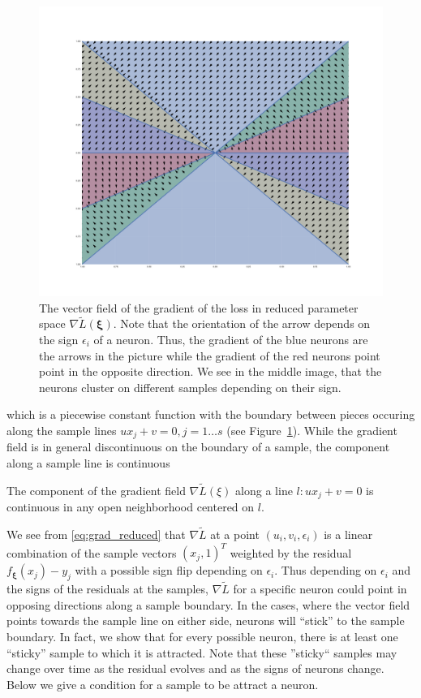 \begin{figure}
    \endminipage
        \includegraphics[width=\linewidth]{figures/reduced_gradient_vector_field.pdf}
    \endminipage\hfill
    \caption{The vector field of the gradient of the loss in reduced parameter space $\nabla \tilde{L}(\bm \xi)$. Note that the orientation of the arrow depends on the sign $\epsilon_i$ of a neuron. Thus, the gradient of the blue neurons are the arrows in the picture while the gradient of the red neurons point point in the opposite direction. We see in the middle image, that the neurons cluster on different samples depending on their sign.}
    \label{fig:reduced_grad}
\end{figure}

which is a piecewise constant function with the boundary between pieces occuring along the sample lines $u x_j + v = 0, j = 1 \ldots s$ (see Figure~\ref{fig:reduced_grad}). While the gradient field is in general discontinuous on the boundary of a sample, the component along a sample line is continuous

\begin{lemma}
The component of the gradient field $\nabla \tilde{L}(\xi)$ along a line $l : u x_j + v = 0$ is continuous in any open neighborhood centered on $l$.
\end{lemma}

We see from \eqref{eq:grad_reduced} that $\nabla \tilde{L}$ at a point $(u_i, v_i, \epsilon_i)$ is a linear combination of the sample vectors $(x_j, 1)^T$  weighted by the residual $f_{\bm \xi}(x_j) - y_j$ with a possible sign flip depending on $\epsilon_i$. Thus depending on $\epsilon_i$ and the signs of the residuals at the samples, $\nabla \tilde{L}$ for a specific neuron could point in opposing directions along a sample boundary. In the cases, where the vector field points towards the sample line on either side, neurons will ``stick'' to the sample boundary. In fact, we show that for every possible neuron, there is at least one ``sticky'' sample to which it is attracted. Note that these ''sticky`` samples may change over time as the residual evolves and as the signs of neurons change. Below we give a condition for a sample to be attract a neuron. 

